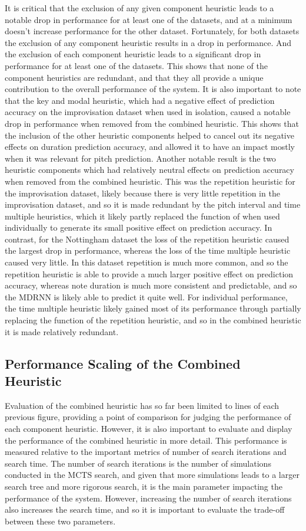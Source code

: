 It is critical that the exclusion of any given component heuristic leads to a notable drop in performance for at least one of the datasets, and at a minimum doesn't increase performance for the other dataset. Fortunately, for both datasets the exclusion of any component heuristic results in a drop in performance. And the exclusion of each component heuristic leads to a significant drop in performance for at least one of the datasets. This shows that none of the component heuristics are redundant, and that they all provide a unique contribution to the overall performance of the system. It is also important to note that the key and modal heuristic, which had a negative effect of prediction accuracy on the improvisation dataset when used in isolation, caused a notable drop in performance when removed from the combined heuristic. This shows that the inclusion of the other heuristic components helped to cancel out its negative effects on duration prediction accuracy, and allowed it to have an impact mostly when it was relevant for pitch prediction. Another notable result is the two heuristic components which had relatively neutral effects on prediction accuracy when removed from the combined heuristic. This was the repetition heuristic for the improvisation dataset, likely because there is very little repetition in the improvisation dataset, and so it is made redundant by the pitch interval and time multiple heuristics, which it likely partly replaced the function of when used individually to generate its small positive effect on prediction accuracy. In contrast, for the Nottingham dataset the loss of the repetition heuristic caused the largest drop in performance, whereas the loss of the time multiple heuristic caused very little. In this dataset repetition is much more common, and so the repetition heuristic is able to provide a much larger positive effect on prediction accuracy, whereas note duration is much more consistent and predictable, and so the MDRNN is likely able to predict it quite well. For individual performance, the time multiple heuristic likely gained most of its performance through partially replacing the function of the repetition heuristic, and so in the combined heuristic it is made relatively redundant.

\subsection{Performance Scaling of the Combined Heuristic}
Evaluation of the combined heuristic has so far been limited to lines of each previous figure, providing a point of comparison for judging the performance of each component heuristic. However, it is also important to evaluate and display the performance of the combined heuristic in more detail. This performance is measured relative to the important metrics of number of search iterations and search time. The number of search iterations is the number of simulations conducted in the MCTS search, and given that more simulations leads to a larger search tree and more rigorous search, it is the main parameter impacting the performance of the system. However, increasing the number of search iterations also increases the search time, and so it is important to evaluate the trade-off between these two parameters.

